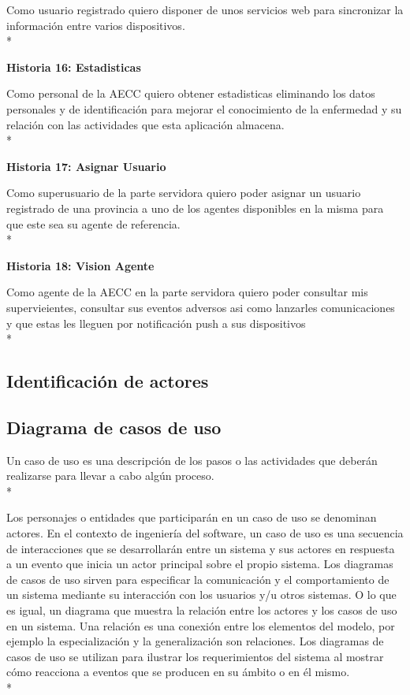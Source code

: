 \documentclass[../pfc.tex]{subfiles}
\begin{document}
		Como usuario registrado quiero disponer de unos servicios web para sincronizar la información entre varios dispositivos.\\*
	
	
	\textbf{Historia 16: Estadisticas}
	
		Como personal de la AECC quiero obtener estadisticas eliminando los datos personales y de identificación para mejorar el conocimiento de la enfermedad y su relación con las actividades que esta aplicación almacena.\\*
	
	
	\textbf{Historia 17: Asignar Usuario}
	
		Como superusuario de la parte servidora quiero poder asignar un usuario registrado de una provincia a uno de los agentes disponibles en la misma para que este sea su agente de referencia.\\*


	\textbf{Historia 18: Vision Agente}
	
		Como agente de la AECC en la parte servidora quiero poder consultar mis supervieientes, consultar sus eventos adversos asi como lanzarles comunicaciones y que estas les lleguen por notificación push a sus dispositivos\\*
		

	\subsection{Identificación de actores}
		
	\subsection{Diagrama de casos de uso }
		
	Un caso de uso es una descripción de los pasos o las actividades que deberán realizarse para llevar a cabo algún proceso.\\*
	
	Los personajes o entidades que participarán en un caso de uso se denominan actores. En el contexto de ingeniería del software, un caso de uso es una secuencia de interacciones que se desarrollarán entre un sistema y sus actores en respuesta a un evento que inicia un actor principal sobre el propio sistema. Los diagramas de casos de uso sirven para especificar la comunicación y el comportamiento de un sistema mediante su interacción con los usuarios y/u otros sistemas. O lo que es igual, un diagrama que muestra la relación entre los actores y los casos de uso en un sistema. Una relación es una conexión entre los elementos del modelo, por ejemplo la especialización y la generalización son relaciones. Los diagramas de casos de uso se utilizan para ilustrar los requerimientos del sistema al mostrar cómo reacciona a eventos que se producen en su ámbito o en él mismo.\\*
	
\end{document}
